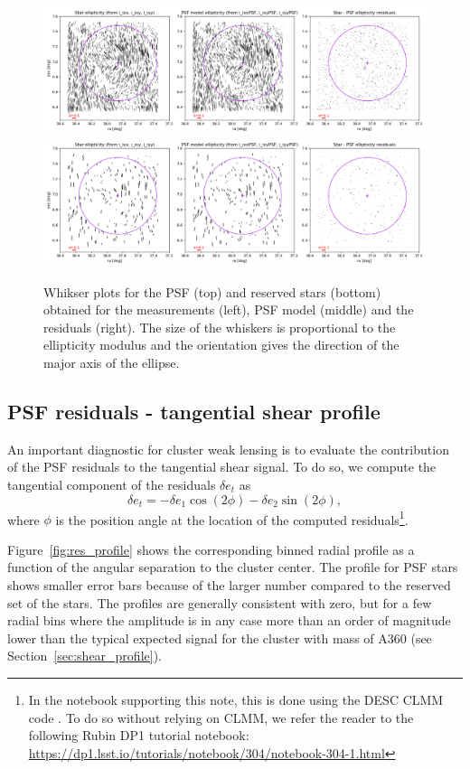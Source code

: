 \documentclass[SE,lsstdraft,authoryear,toc]{lsstdoc}
\begin{document}
\begin{figure}
\includegraphics[width=\textwidth]{Figures/whiskers_used.png}
\includegraphics[width=\textwidth]{Figures/whiskers_reserved.png}
\caption{Whikser plots for the PSF (top) and reserved stars (bottom) obtained for the measurements (left), PSF model (middle) and the residuals (right). The size of the whiskers is proportional to the ellipticity modulus and the orientation gives the direction of the major axis of the ellipse. \label{fig:whiskers}}
\end{figure}

\subsection{PSF residuals - tangential shear profile}

An important diagnostic for cluster weak lensing is to evaluate the contribution of the PSF residuals to the tangential shear signal. To do so, we compute the tangential component of the residuals $\delta e_t$ as 
\begin{equation}
\delta e_t = - \delta e_1  \cos(2 \phi) - \delta e_2  \sin(2 \phi),
\end{equation}
where $\phi$ is the position angle at the location of the computed residuals\footnote{In the notebook supporting this note, this is done using the DESC CLMM code \citep{2021MNRAS.508.6092A}. To do so without relying on CLMM, we refer the reader to the following Rubin DP1 tutorial notebook: \url{https://dp1.lsst.io/tutorials/notebook/304/notebook-304-1.html}}.

Figure~{\ref{fig:res_profile}} shows the corresponding binned radial profile as a function of the angular separation to the cluster center. The profile for PSF stars shows smaller error bars because of the larger number compared to the reserved set of the stars. The profiles are generally consistent with zero, but for a few radial bins where the amplitude is in any case more than an order of magnitude lower than the typical expected signal for the cluster with mass of A360 (see Section~\ref{sec:shear_profile}). 
\end{document}
